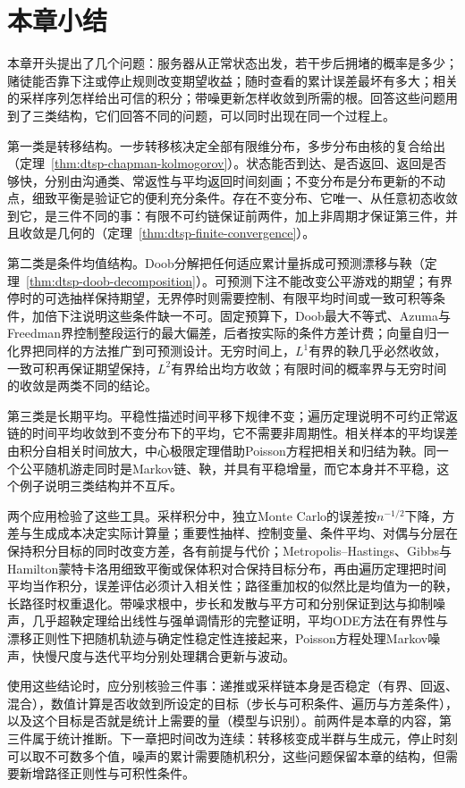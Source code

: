 \section{本章小结}
\label{sec:dtsp-summary}

本章开头提出了几个问题：服务器从正常状态出发，若干步后拥堵的概率是多少；赌徒能否靠下注或停止规则改变期望收益；随时查看的累计误差最坏有多大；相关的采样序列怎样给出可信的积分；带噪更新怎样收敛到所需的根。回答这些问题用到了三类结构，它们回答不同的问题，可以同时出现在同一个过程上。

第一类是转移结构。一步转移核决定全部有限维分布，多步分布由核的复合给出（定理~\ref{thm:dtsp-chapman-kolmogorov}）。状态能否到达、是否返回、返回是否够快，分别由沟通类、常返性与平均返回时间刻画；不变分布是分布更新的不动点，细致平衡是验证它的便利充分条件。存在不变分布、它唯一、从任意初态收敛到它，是三件不同的事：有限不可约链保证前两件，加上非周期才保证第三件，并且收敛是几何的（定理~\ref{thm:dtsp-finite-convergence}）。

第二类是条件均值结构。Doob分解把任何适应累计量拆成可预测漂移与鞅（定理~\ref{thm:dtsp-doob-decomposition}）。可预测下注不能改变公平游戏的期望；有界停时的可选抽样保持期望，无界停时则需要控制、有限平均时间或一致可积等条件，加倍下注说明这些条件缺一不可。固定预算下，Doob最大不等式、Azuma与Freedman界控制整段运行的最大偏差，后者按实际的条件方差计费；向量自归一化界把同样的方法推广到可预测设计。无穷时间上，$L^1$有界的鞅几乎必然收敛，一致可积再保证期望保持，$L^2$有界给出均方收敛；有限时间的概率界与无穷时间的收敛是两类不同的结论。

第三类是长期平均。平稳性描述时间平移下规律不变；遍历定理说明不可约正常返链的时间平均收敛到不变分布下的平均，它不需要非周期性。相关样本的平均误差由积分自相关时间放大，中心极限定理借助Poisson方程把相关和归结为鞅。同一个公平随机游走同时是Markov链、鞅，并具有平稳增量，而它本身并不平稳，这个例子说明三类结构并不互斥。

两个应用检验了这些工具。采样积分中，独立Monte Carlo的误差按$n^{-1/2}$下降，方差与生成成本决定实际计算量；重要性抽样、控制变量、条件平均、对偶与分层在保持积分目标的同时改变方差，各有前提与代价；Metropolis--Hastings、Gibbs与Hamilton蒙特卡洛用细致平衡或保体积对合保持目标分布，再由遍历定理把时间平均当作积分，误差评估必须计入相关性；路径重加权的似然比是均值为一的鞅，长路径时权重退化。带噪求根中，步长和发散与平方可和分别保证到达与抑制噪声，几乎超鞅定理给出线性与强单调情形的完整证明，平均ODE方法在有界性与漂移正则性下把随机轨迹与确定性稳定性连接起来，Poisson方程处理Markov噪声，快慢尺度与迭代平均分别处理耦合更新与波动。

使用这些结论时，应分别核验三件事：递推或采样链本身是否稳定（有界、回返、混合），数值计算是否收敛到所设定的目标（步长与可积条件、遍历与方差条件），以及这个目标是否就是统计上需要的量（模型与识别）。前两件是本章的内容，第三件属于统计推断。下一章把时间改为连续：转移核变成半群与生成元，停止时刻可以取不可数多个值，噪声的累计需要随机积分，这些问题保留本章的结构，但需要新增路径正则性与可积性条件。
